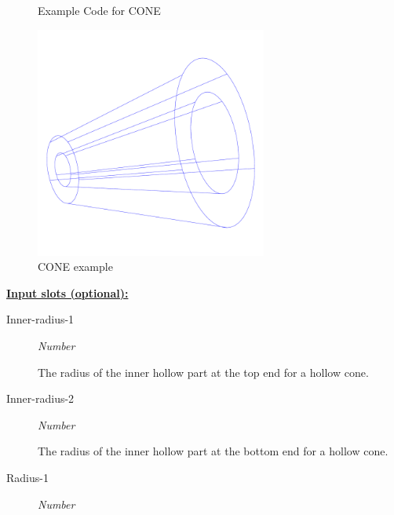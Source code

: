 \documentclass [11pt]{book}
\begin{document}
\begin{itemize}
\begin{figure}
\begin{lrbox}{\boxedverb}
\begin{minipage}{\linewidth}
{\begin{verbatim}
\end{verbatim}}
\end{minipage}
\end{lrbox}
\fbox{\usebox{\boxedverb}}

\caption{Example Code for CONE}

\label{fig:example-code-CONE}

\end{figure}

\begin{figure}
\begin{center}
\includegraphics[width=3in,height=3in]{../images/example-CONE.pdf}
\end{center}

\caption{CONE example}

\label{fig:CONE}

\end{figure}





\textbf{
\underline{Input slots (optional):}}

\begin{description}

\item [Inner-radius-1]
\emph{Number}

 The radius of the inner hollow part at the top end for a hollow cone.




\item [Inner-radius-2]
\emph{Number}

 The radius of the inner hollow part at the bottom end for a hollow cone.




\item [Radius-1]
\emph{Number}


\end{description}
\end{itemize}
\end{document}
